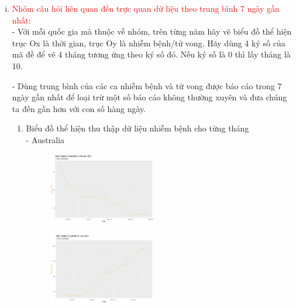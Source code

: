 \documentclass[a4paper]{article}
\theoremstyle{definition}
\begin{document}
\begin{enumerate}[i)]
\item \textcolor{red}{Nhóm câu hỏi liên quan đến trực quan dữ liệu theo trung bình 7 ngày gần nhất:}\\
- Với mỗi quốc gia mà thuộc về nhóm, trên từng năm hãy vẽ biểu đồ thể hiện trục Ox là thời gian, trục Oy là nhiễm bệnh/tử vong. Hãy dùng 4 ký số của mã đề để vẽ 4 tháng tương ứng theo ký số đó. Nếu ký số là 0 thì lấy tháng là 10.

- Dùng trung bình của các ca nhiễm bệnh và tử vong được báo cáo trong 7 ngày gần nhất để loại trừ một số báo cáo không thường xuyên và đưa chúng ta đến gần hơn với con số hàng ngày.

\begin{enumerate}[1)]
    \item Biểu đồ thể hiện thu thập dữ liệu nhiễm bệnh cho từng tháng\\
    - Australia\\
		\begin{figure} [!htp]
  		\centering
  		\includegraphics [width=0.47\textwidth] {Images/aus_ncases_7}
		\end{figure}
		
		\begin{figure} [!htp]
  		\centering
  		\includegraphics [width=0.47\textwidth] {Images/aus_ncases_6}
		\end{figure}
		
		\begin{figure} [!htp]
  		\centering
		\end{figure}
		

\end{enumerate}
\end{enumerate}
\end{document}
